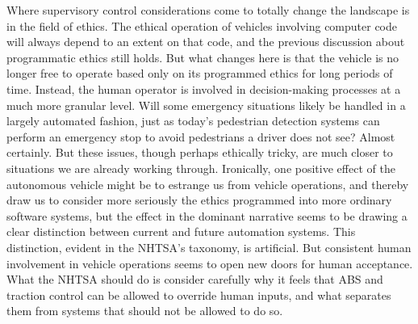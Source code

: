 Where supervisory control considerations come to totally change
the landscape is in the field of ethics. The ethical operation of
vehicles involving computer code will always depend to an extent on
that code, and the previous discussion about programmatic ethics still
holds. But what changes here is that the vehicle is no longer free to
operate based only on its programmed ethics for long periods of time.
Instead, the human operator is involved in decision-making processes
at a much more granular level. Will some emergency situations likely
be handled in a largely automated fashion, just as today's pedestrian
detection systems can perform an emergency stop to avoid pedestrians a
driver does not see? Almost certainly. But these issues, though
perhaps ethically tricky, are much closer to situations we are already
working through. Ironically, one positive effect of the autonomous vehicle
might be to estrange us from vehicle operations, and thereby draw us
to consider more seriously the ethics programmed into more ordinary software
systems, but the effect in the dominant narrative seems to be drawing a
clear distinction between current and future automation systems. This
distinction, evident in the NHTSA's taxonomy, is artificial. But
consistent human involvement in vehicle operations seems to open new
doors for human acceptance. What the NHTSA should do is consider carefully why it feels that
ABS and traction control can be allowed to override human inputs, and
what separates them from systems that should not be allowed to do so.



